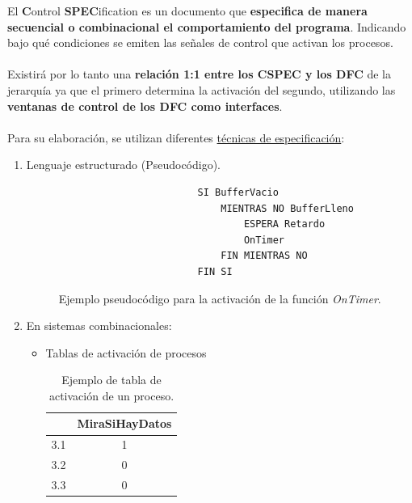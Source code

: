 El \textbf{C}ontrol \textbf{SPEC}ification es un documento que \textbf{especifica de manera secuencial o combinacional el comportamiento del programa}. Indicando bajo qué condiciones se emiten las señales de control que activan los procesos.
\\ 
\\
Existirá por lo tanto una \textbf{relación 1:1 entre los CSPEC y los DFC} de la jerarquía ya que el primero determina la activación del segundo, utilizando las \textbf{ventanas de control de los DFC como interfaces}.
\\
\\
Para su elaboración, se utilizan diferentes \uline{técnicas de especificación}:
\begin{enumerate}
    \item Lenguaje estructurado (Pseudocódigo). %
\begin{figure}[h!]
\centering
  \begin{verbatim}
                        SI BufferVacio
                            MIENTRAS NO BufferLleno
                                ESPERA Retardo
                                OnTimer
                            FIN MIENTRAS NO
                        FIN SI
  \end{verbatim}
  \caption{Ejemplo pseudocódigo para la activación de la función \emph{OnTimer}.}
\end{figure}
    \item En sistemas combinacionales:
    \begin{itemize}
        \item Tablas de activación de procesos %
        \begin{table}[h!]
        \centering
            \begin{tabular}{|c|c|} \cline{1-2}
             & MiraSiHayDatos \\ \hline
            3.1 & 1 \\ \hline
            3.2 & 0 \\ \hline
            3.3 & 0  \\ \hline
            \end{tabular}
            \caption{Ejemplo de tabla de activación de un proceso.}
        \end{table}


\end{itemize}
\end{enumerate}
